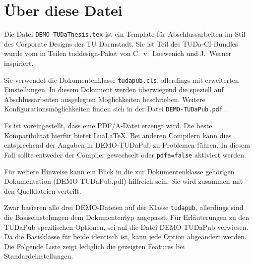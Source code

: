 \documentclass[
	ngerman,
	ruledheaders=section,%
	class=report,%
	thesis={type=bachelor},%
	accentcolor=9c,%
	custommargins=true,%
	marginpar=false,%
	parskip=half-,%
	fontsize=11pt,%
]{tudapub}
\let\file\texttt
\let\code\texttt
\begin{document}
\tableofcontents


\chapter{Über diese Datei}
Die Datei \file{DEMO-TUDaThesis.tex} ist ein Template für Abschlussarbeiten im Stil des Corporate Designs der TU Darmstadt.
Sie ist Teil des TUDa-CI-Bundles wurde vom in Teilen tuddesign-Paket von C.~v.~Loewenich und J.~Werner inspiriert.

Sie verwendet die Dokumentenklasse \file{tudapub.cls}, allerdings mit erweiterten Einstellungen. In diesem Dokument werden überwiegend die speziell auf Abschlussarbeiten ausgelegten Möglichkeiten beschrieben. Weitere Konfigurationsmöglichkeiten finden sich in der Datei \file{DEMO-TUDaPub.pdf} \cite{tudapub}.

Es ist voreingestellt, dass eine PDF/A-Datei erzeugt wird. Die beste Kompatibilität hierfür bietet Lua\LaTeX. Bei anderen Compilern kann dies entsprechend der Angaben in DEMO-TUDaPub zu Problemen führen. In diesem Fall sollte entweder der Compiler gewechselt oder \code{pdfa=false} aktiviert werden.

Für weitere Hinweise kann ein Blick in die zur Dokumentenklasse gehörigen Dokumentation (DEMO-TUDaPub.pdf) hilfreich sein. Sie wird zusammen mit den Quelldateien verteilt.

Zwar basieren alle drei DEMO-Dateien auf der Klasse \code{tudapub}, allerdings sind die Basiseinstelungen dem Dokumententyp angepasst.
Für Erläuterungen zu den TUDaPub spezifischen Optionen, sei auf die Datei DEMO-TUDaPub verwiesen.
Da die Basisklasse für beide identisch ist, kann jede Option abgeändert werden. Die Folgende Liste zeigt lediglich die gezeigten Features bei Standardeinstellungen.
\end{document}
